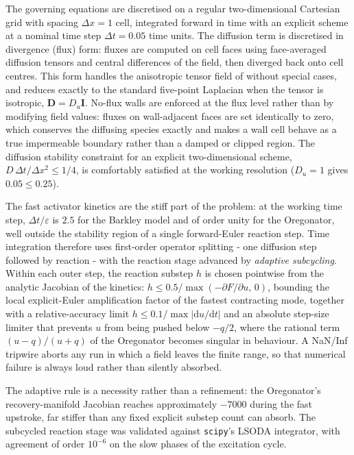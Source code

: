 The governing equations are discretised on a regular two-dimensional Cartesian grid with spacing $\Delta x = 1$ cell, integrated forward in time with an explicit scheme at a nominal time step $\Delta t = 0.05$ time units. 
The diffusion term is discretised in divergence (flux) form: fluxes are computed on cell faces using face-averaged diffusion tensors and central differences of the field, then diverged back onto cell centres. 
This form handles the anisotropic tensor field of  without special cases, and reduces exactly to the standard five-point Laplacian when the tensor is isotropic, $\mathbf{D} = D_{u}\mathbf{I}$. 
No-flux walls are enforced at the flux level rather than by modifying field values: fluxes on wall-adjacent faces are set identically to zero, which conserves the diffusing species exactly and makes a wall cell behave as a true impermeable boundary rather than a damped or clipped region. 
The diffusion stability constraint for an explicit two-dimensional scheme, $D\,\Delta t / \Delta x^{2} \leq 1/4$, is comfortably satisfied at the working resolution ($D_{u} = 1$ gives $0.05 \leq 0.25$).

The fast activator kinetics are the stiff part of the problem: at the working time step, $\Delta t/\varepsilon$ is $2.5$ for the Barkley model and of order unity for the Oregonator, well outside the stability region of a single forward-Euler reaction step. 
Time integration therefore uses first-order operator splitting - one diffusion step followed by reaction - with the reaction stage advanced by \emph{adaptive subcycling}. 
Within each outer step, the reaction substep $h$ is chosen pointwise from the analytic Jacobian of the kinetics: $h \leq 0.5 / \max(-\partial F/\partial u,\,0)$, bounding the local explicit-Euler amplification factor of the fastest contracting mode, together with a relative-accuracy limit $h \leq 0.1 / \max|\mathrm{d}u/\mathrm{d}t|$ and an absolute step-size limiter that prevents $u$ from being pushed below $-q/2$, where the rational term $(u-q)/(u+q)$ of the Oregonator becomes singular in behaviour. 
A NaN/Inf tripwire aborts any run in which a field leaves the finite range, so that numerical failure is always loud rather than silently absorbed.

The adaptive rule is a necessity rather than a refinement: the Oregonator's recovery-manifold Jacobian reaches approximately $-7000$ during the fast upstroke, far stiffer than any fixed explicit substep count can absorb.
The subcycled reaction stage was validated against \texttt{scipy}'s LSODA integrator, with agreement of order $10^{-6}$ on the slow phases of the excitation cycle.

